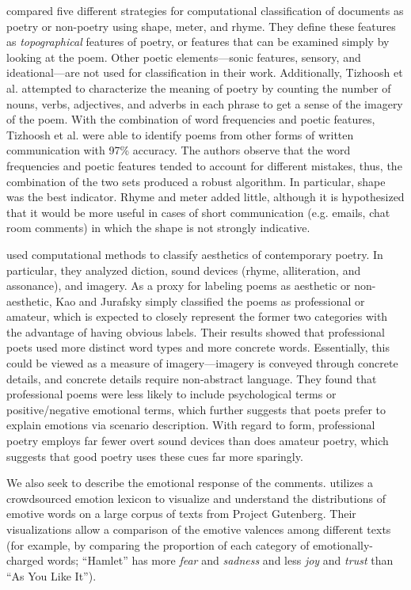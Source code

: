 \documentclass[11pt]{article}
\begin{document}
 compared five different strategies for computational classification of documents as poetry or non-poetry using shape, meter, and rhyme. They define these features as \emph{topographical} features of poetry, or features that can be examined simply by looking at the poem. Other poetic elements---sonic features, sensory, and ideational---are not used for classification in their work. Additionally, Tizhoosh et al. attempted to characterize the meaning of poetry by counting the number of nouns, verbs, adjectives, and adverbs in each phrase to get a sense of the imagery of the poem. With the combination of word frequencies and poetic features, Tizhoosh et al. were able to identify poems from other forms of written communication with 97\% accuracy. The authors observe that the word frequencies and poetic features tended to account for different mistakes, thus, the combination of the two sets produced a robust algorithm. In particular, shape was the best indicator. Rhyme and meter added little, although it is hypothesized that it would be more useful in cases of short communication (e.g. emails, chat room comments) in which the shape is not strongly indicative.

 used computational methods to classify aesthetics of contemporary poetry. In particular, they analyzed diction, sound devices (rhyme, alliteration, and assonance), and imagery. As a proxy for labeling poems as aesthetic or non-aesthetic, Kao and Jurafsky simply classified the poems as professional or amateur, which is expected to closely represent the former two categories with the advantage of having obvious labels. Their results showed that professional poets used more distinct word types and more concrete words. Essentially, this could be viewed as a measure of imagery---imagery is conveyed through concrete details, and concrete details require non-abstract language. They found that professional poems were less likely to include psychological terms or positive/negative emotional terms, which further suggests that poets prefer to explain emotions via scenario description. With regard to form, professional poetry employs far fewer overt sound devices than does amateur poetry, which suggests that good poetry uses these cues far more sparingly.

We also seek to describe the emotional response of the comments.  utilizes a crowdsourced emotion lexicon to visualize and understand the distributions of emotive words on a large corpus of texts from Project Gutenberg. Their visualizations allow a comparison of the emotive valences among different texts (for example, by comparing the proportion of each category of emotionally-charged words; ``Hamlet'' has more \emph{fear} and \emph{sadness} and less \emph{joy} and \emph{trust} than ``As You Like It''). 
\end{document}
